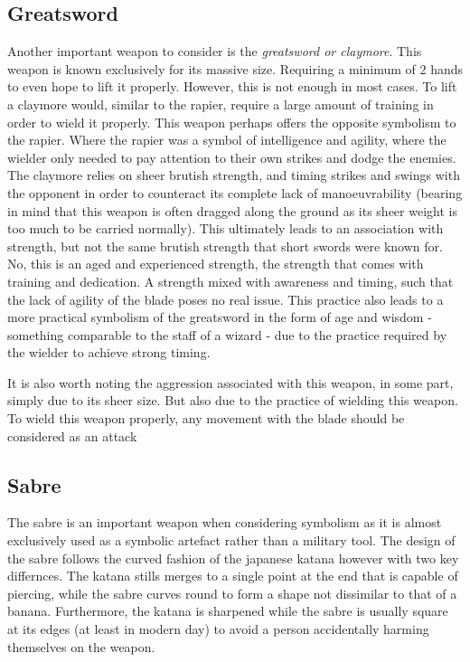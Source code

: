\documentclass{article}
\begin{document}
\subsection{Greatsword} \label{greatswordSymbol}
Another important weapon to consider is the \emph{greatsword or claymore}. This weapon is known exclusively for its massive size. Requiring a minimum of 2 hands to even hope to lift it properly. However, this is not enough in most cases. To lift a claymore would, similar to the rapier, require a large amount of training in order to wield it properly. This weapon perhaps offers the opposite symbolism to the rapier. Where the rapier was a symbol of intelligence and agility, where the wielder only needed to pay attention to their own strikes and dodge the enemies. The claymore relies on sheer brutish strength, and timing strikes and swings with the opponent in order to counteract its complete lack of manoeuvrability (bearing in mind that this weapon is often dragged along the ground as its sheer weight is too much to be carried normally). This ultimately leads to an association with strength, but not the same brutish strength that short swords were known for. No, this is an aged and experienced strength, the strength that comes with training and dedication. A strength mixed with awareness and timing, such that the lack of agility of the blade poses no real issue. This practice also leads to a more practical symbolism of the greatsword in the form of age and wisdom - something comparable to the staff of a wizard - due to the practice required by the wielder to achieve strong timing.

It is also worth noting the aggression associated with this weapon, in some part, simply due to its sheer size. But also due to the practice of wielding this weapon. To wield this weapon properly, any movement with the blade should be considered as an attack

\subsection{Sabre} \label{saberSymbol}
The sabre is an important weapon when considering symbolism as it is almost exclusively used as a symbolic artefact rather than a military tool. The design of the sabre follows the curved fashion of the japanese katana however with two key differnces. The katana stills merges to a single point at the end that is capable of piercing, while the sabre curves round to form a shape not dissimilar to that of a banana. Furthermore, the katana is sharpened while the sabre is usually square at its edges (at least in modern day) to avoid a person accidentally harming themselves on the weapon.
\end{document}
